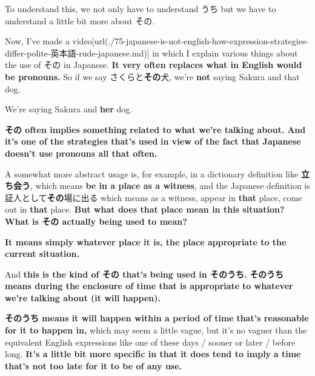 To understand this, we not only have to understand うち but we have to understand a little bit more about その.

\startsectionlevel[title={What does その mean},reference={what-does-その-mean}]

Now, I've made a video\goto{{[}75{]}}[url(./75-japanese-is-not-english-how-expression-strategies-differ-polite-英本語-rude-japanese.md)] in which I explain various things about the use of その in Japanese. {\bf It very often replaces what in English would be pronouns.} So if we say さくらと{\bf その}犬, we're {\bf not} saying Sakura and that dog.

We're saying Sakura and {\bf her} dog.

{}

{\bf その often implies something related to what we're talking about.} {\bf And it's one of the strategies that's used} {\bf in view of the fact that Japanese doesn't use pronouns all that often.}

\thinrule

A somewhat more abstract usage is, for example, in a dictionary definition like {\bf 立ち会う}, which means {\bf be in a place as a witness}, and the Japanese definition is 証人として{\bf その}場に出る which means as a witness, appear in {\bf that} place, come out in {\bf that} place. {\bf But what does that place mean in this situation?} {\bf What is その actually being used to mean?}

{\bf It means simply whatever place it is, the place appropriate to the current situation.}

\stopsectionlevel

\startsectionlevel[title={So, what does そのうち mean?},reference={so-what-does-そのうち-mean}]

And {\bf this is the kind of その that's being used in そのうち.} {\bf そのうち means during the enclosure of time that is appropriate} {\bf to whatever we're talking about (it will happen).}

{}

{\bf そのうち means it will happen within a period of time} {\bf that's reasonable for it to happen in,} which may seem a little vague, but it's no vaguer than the equivalent English expressions like one of these days / sooner or later / before long. {\bf It's a little bit more specific in that it does tend to imply} {\bf a time that's not too late for it to be of any use.}

